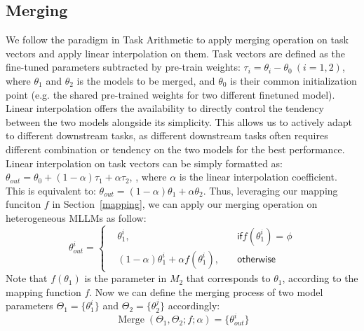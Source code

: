 \subsection{Merging}
We follow the paradigm in Task Arithmetic \cite{task-arithmetic} to apply merging operation on task vectors and apply linear interpolation on them. 
Task vectors are defined as the fine-tuned parameters subtracted by pre-train weights: $\tau_i = \theta_i - \theta_0 \ (i=1,2)$, where $\theta_1$ and $\theta_2$ is the models to be merged, and $\theta_0$ is their common initialization point (e.g. the shared pre-trained weights for two different finetuned model).
Linear interpolation offers the availability to directly control the tendency between the two models alongside its simplicity. This allows us to actively adapt to different downstream tasks, as different downstream tasks often requires different combination or tendency on the two models for the best performance.
Linear interpolation on task vectors can be simply formatted as:  $\theta_{out} = \theta_0 + (1-\alpha) \tau_1 + \alpha \tau_2$, 
\noindent, where $\alpha$ is the linear interpolation coefficient. This is equivalent to: $\theta_{out} = (1-\alpha) \theta_1 + \alpha \theta_2$.
Thus, leveraging our mapping funciton $f$ in Section~\ref{mapping}, we can apply our merging operation on heterogeneous MLLMs as follow:
\begin{equation}
    \theta_{out}^i =\left\{
    \begin{aligned}
        &\theta_1^i, \quad & \mathsf{if}  f(\theta_1^i) = \phi
        \\
        &(1-\alpha) \theta_1^i + \alpha f(\theta_1^i),  \quad &          \mathsf{otherwise}
    \end{aligned} \right.
\end{equation}
Note that $f(\theta_1)$ is the parameter in $M_2$ that corresponds to $\theta_1$, according to the mapping function $f$. Now we can define the merging process of two model parameters $\Theta_1=\{\theta_1^i\}$ and $\Theta_2=\{\theta_2^j\}$ accordingly:
\begin{equation}
    \operatorname*{Merge}(\Theta_1, \Theta_2; f; \alpha) = \{\theta_{out}^i\} \label{eq:merge}
\end{equation}



